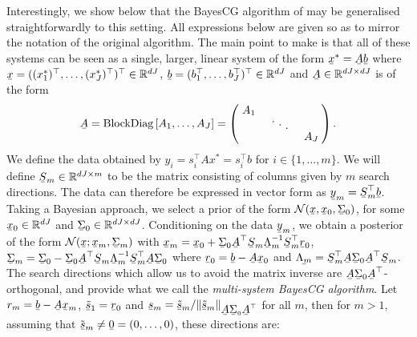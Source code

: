 \documentclass[twoside]{article}
\newcommand\barbelow[1]{\stackunder[1.2pt]{$#1$}{\rule{.8ex}{.075ex}}}
\newcommand{\diagentry}[1]{\mathmakebox[1.8em]{#1}}
\newcommand{\xddots}{%
  \raise 4pt \hbox {.}
  \mkern 6mu
  \raise 1pt \hbox {.}
  \mkern 6mu
  \raise -2pt \hbox {.}
}
\begin{document}
Interestingly, we show below that the BayesCG algorithm of \cite{Cockayne2019} may be generalised straightforwardly to this setting. All expressions below are given so as to mirror the notation of the original algorithm. The main point to make is that all of these systems can be seen as a single, larger, linear system of the form $\barbelow{x}^* = \barbelow{A} \barbelow{b}$ where $\barbelow{x} = ((x^*_1)^\top,\ldots,(x^*_J)^\top)^\top \in \mathbb{R}^{dJ}$, $\barbelow{b} = (b_1^\top,\ldots,b_J^\top)^\top \in \mathbb{R}^{dJ}$ and $\barbelow{A} \in \mathbb{R}^{dJ \times dJ}$ is of the form
\begin{align*}
	\barbelow{A} = \text{BlockDiag}\left[A_1,\ldots,A_J\right] = 
	\begin{pmatrix}
    \diagentry{A_1}\\
    &\diagentry{\xddots}\\
    &&\diagentry{A_J}\\
	\end{pmatrix}.
	\end{align*}
 We define the data obtained by $y_{i} = s_{i}^\top A x^* = s_{i}^\top b$ for $i \in \{1,\ldots,m\}$. We will define $\barbelow{S}_m \in \mathbb{R}^{dJ \times m}$ to be the matrix consisting of columns given by $m$ search directions. The data can therefore be expressed in vector form as $\barbelow{y}_m = \barbelow{S}_m^\top \barbelow{b}$. Taking a Bayesian approach, we select a prior of the form $\mathcal{N}(\barbelow{x},\barbelow{x}_0,\barbelow{\Sigma}_0)$, for some $\barbelow{x}_0 \in \mathbb{R}^{dJ}$ and $\barbelow{\Sigma}_0 \in \mathbb{R}^{dJ \times dJ}$. Conditioning on the data $\barbelow{y}_m$, we obtain a posterior of the form $\mathcal{N}(\barbelow{x} ; \barbelow{x}_m,\barbelow{\Sigma}_m)$ with $\barbelow{x}_m  = \barbelow{x}_0 + \barbelow{\Sigma}_0 \barbelow{A}^\top \barbelow{S}_m \barbelow{\Lambda}_m^{-1} \barbelow{S}_m^\top \barbelow{r}_0$, $\barbelow{\Sigma}_m  = \barbelow{\Sigma}_0 - \barbelow{\Sigma}_0 \barbelow{A}^\top \barbelow{S}_m \barbelow{\Lambda}_{m}^{-1} \barbelow{S}_m^\top \barbelow{A} \barbelow{\Sigma}_0$ where $\barbelow{r}_0 = \barbelow{b} - \barbelow{A} \barbelow{x}_0$ and $\barbelow{\Lambda_m} = \barbelow{S}_m^\top \barbelow{A} \barbelow{\Sigma}_0 \barbelow{A}^\top \barbelow{S}_m$. The search directions which allow us to avoid the matrix inverse are $\barbelow{A} \barbelow{\Sigma}_0 \barbelow{A}^\top$-orthogonal, and provide what we call the \emph{multi-system BayesCG algorithm}. Let $r_m = \barbelow{b} - \barbelow{A} \barbelow{x}_m$, $\barbelow{\tilde{s}}_1 = \barbelow{r}_0$ and $\barbelow{s}_m = \barbelow{\tilde{s}}_m/\|\barbelow{\tilde{s}}_m\|_{\barbelow{A} \barbelow{\Sigma}_0 \barbelow{A}^\top}$ for all $m$, then for $m>1$, assuming that $\tilde{\barbelow{s}}_m \neq \barbelow{0} = (0,\ldots,0)$, these directions are:
\end{document}
